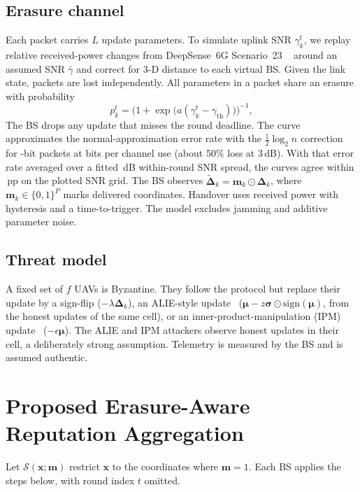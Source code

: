 \documentclass[journal]{IEEEtran}
\newcommand{\pp}{\,pp}
\begin{document}
\subsection{Erasure channel}
Each packet carries $L$ update parameters. To simulate uplink SNR $\gamma_k^t$,
we replay relative received-power changes from DeepSense~6G Scenario~23%
~\cite{alkhateeb2023deepsense,charan2025drone} around an assumed SNR $\bar\gamma$ and
correct for 3-D distance to each virtual BS. Given the link state, packets are lost
independently. All parameters in a packet share an erasure with probability
\begin{equation}
  p_k^t = \bigl(1+\exp\bigl(a(\gamma_k^t-\gamma_{\mathrm{th}})\bigr)\bigr)^{-1},
\end{equation}
The BS drops any update that misses the round deadline. The curve approximates the
normal-approximation error rate with the $\tfrac12\log_2 n$ correction~\cite{polyanskiy2010finite}
for \PerBits-bit packets at \PerRate{} bits per channel use (about 50\% loss at 3\,dB).
With that error rate averaged over a fitted \PerSpread\,dB within-round SNR spread,
the curves agree within \PerMaxGap\pp{} on the plotted SNR grid. The BS observes
$\tilde{\boldsymbol\Delta}_k=\mathbf{m}_k\odot\boldsymbol\Delta_k$, where
$\mathbf{m}_k\in\{0,1\}^P$ marks delivered coordinates. Handover uses received power
with hysteresis and a time-to-trigger. The model excludes jamming and additive
parameter noise.

\subsection{Threat model}
A fixed set of $f$ UAVs is Byzantine. They follow the protocol but replace their
update by a sign-flip ($-\lambda\boldsymbol\Delta_k$), an ALIE-style
update~\cite{baruch2019alie} ($\boldsymbol\mu - z\boldsymbol\sigma\odot\mathrm{sign}(\boldsymbol\mu)$,
from the honest updates of the same cell), or an inner-product-manipulation (IPM)
update~\cite{xie2019ipm} ($-\epsilon\boldsymbol\mu$). The ALIE and IPM attackers observe
honest updates in their cell, a deliberately strong assumption. Telemetry is measured
by the BS and is assumed authentic.

\section{Proposed Erasure-Aware Reputation Aggregation}
\label{sec:method}
Let $\mathcal{S}(\mathbf{x};\mathbf{m})$ restrict $\mathbf{x}$ to the coordinates where
$\mathbf{m}=1$. Each BS applies the steps below, with round index $t$ omitted.
\end{document}
